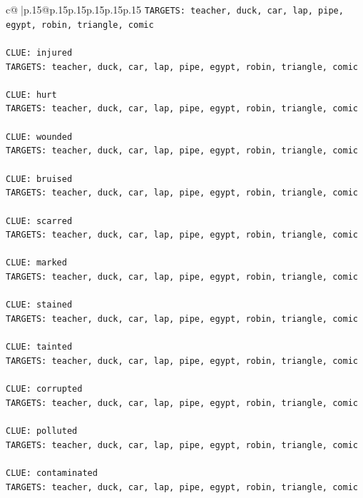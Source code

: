 \documentclass{article}
\begin{document}
{\begin{supertabular}{c@{$\;$}|p{.15\linewidth}@{}p{.15\linewidth}p{.15\linewidth}p{.15\linewidth}p{.15\linewidth}p{.15\linewidth}}
{{{\texttt{TARGETS: teacher, duck, car, lap, pipe, egypt, robin, triangle, comic} \\
\\ 
\texttt{CLUE: injured} \\
\texttt{TARGETS: teacher, duck, car, lap, pipe, egypt, robin, triangle, comic} \\
\\ 
\texttt{CLUE: hurt} \\
\texttt{TARGETS: teacher, duck, car, lap, pipe, egypt, robin, triangle, comic} \\
\\ 
\texttt{CLUE: wounded} \\
\texttt{TARGETS: teacher, duck, car, lap, pipe, egypt, robin, triangle, comic} \\
\\ 
\texttt{CLUE: bruised} \\
\texttt{TARGETS: teacher, duck, car, lap, pipe, egypt, robin, triangle, comic} \\
\\ 
\texttt{CLUE: scarred} \\
\texttt{TARGETS: teacher, duck, car, lap, pipe, egypt, robin, triangle, comic} \\
\\ 
\texttt{CLUE: marked} \\
\texttt{TARGETS: teacher, duck, car, lap, pipe, egypt, robin, triangle, comic} \\
\\ 
\texttt{CLUE: stained} \\
\texttt{TARGETS: teacher, duck, car, lap, pipe, egypt, robin, triangle, comic} \\
\\ 
\texttt{CLUE: tainted} \\
\texttt{TARGETS: teacher, duck, car, lap, pipe, egypt, robin, triangle, comic} \\
\\ 
\texttt{CLUE: corrupted} \\
\texttt{TARGETS: teacher, duck, car, lap, pipe, egypt, robin, triangle, comic} \\
\\ 
\texttt{CLUE: polluted} \\
\texttt{TARGETS: teacher, duck, car, lap, pipe, egypt, robin, triangle, comic} \\
\\ 
\texttt{CLUE: contaminated} \\
\texttt{TARGETS: teacher, duck, car, lap, pipe, egypt, robin, triangle, comic} \\
}}}
\end{supertabular}}
\end{document}
